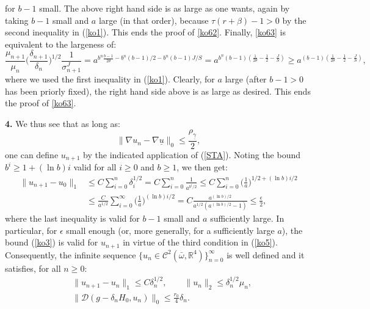 \documentclass[reqno,twoside,11pt]{amsart}
\newcommand{\R}{\mathbb{R}}
\numberwithin{equation}{section}
\theoremstyle{plain}
\theoremstyle{definition}
\begin{document}
for $b-1$ small. The above right hand side is as large as one wants, again by taking
$b-1$ small and $a$ large (in that order), because $\tau(r+\beta)-1>0$
by the second inequality in (\ref{ko1}). This ends the proof of
\ref{ko62}. Finally, \ref{ko63} is equivalent to the largeness of:
\begin{equation*} 
\frac{\mu_{n+1}}{\mu_n}\big(\frac{\delta_{n+1}}{\delta_n}\big)^{1/2}\frac{1}{\sigma_{n+1}^J}
= a^{b^n\frac{b-1}{2\theta} - b^n(b-1)/2-b^n(b-1)J/S} =
a^{b^n(b-1)(\frac{1}{2\theta}-\frac{1}{2}-\frac{J}{S}) }\geq
a^{(b-1)(\frac{1}{2\theta}-\frac{1}{2}-\frac{J}{S})},
\end{equation*}
where we used the first inequality in (\ref{ko1}). Clearly, for $a$
large (after $b-1>0$ has been priorly fixed), the right hand side
above is as large as desired. This ends the proof of \ref{ko63}. 

\smallskip

{\bf 4.} We thus see that as long as:
\begin{equation}\label{ko3}
\|\nabla u_n - \nabla \underline u\|_0\leq \frac{\rho_{\underline \gamma}}{2},
\end{equation}
one can define $u_{n+1}$ by the indicated application of (\ref{STA}). 
Noting the bound $b^i\geq 1+(\ln b)i$ valid for all $i\geq 0$ and $b\geq 1$, we then get: 
\begin{equation}\label{ko7} 
\begin{split}
\|u_{n+1}-u_0\|_1& \leq C\sum_{i=0}^{n}\delta_i^{1/2}= C\sum_{i=0}^{n}
\frac{1}{a^{b^i/2}}\leq C\sum_{i=0}^{n}
\Big(\frac{1}{a}\Big)^{1/2+(\ln b)i/2} \\ & \leq \frac{C}{a^{1/2}}\sum_{i=0}^\infty
\Big(\frac{1}{a}\Big)^{(\ln b)i/2} = C \frac{a^{(\ln b)/2}}{a^{1/2} (a^{(\ln b)/2}-1)}\leq\frac{\epsilon}{2},
\end{split}
\end{equation}
where the last inequality is valid for $b-1$ small and $a$ sufficiently large. 
In particular, for $\epsilon$ small enough (or, more generally, for a
sufficiently large $a$), the bound (\ref{ko3}) is valid for $u_{n+1}$ in
virtue of the third condition in (\ref{ko5}). Consequently, the infinite sequence
$\{u_n\in\mathcal{C}^2(\bar\omega,\R^4)\}_{n=0}^\infty$ is well
defined and it satisfies, for all $n\geq 0$:
\begin{equation}\label{ko8}
\begin{split}
& \|u_{n+1}-u_n\|_1\leq C\delta_{n}^{1/2}, \qquad \|u_{n}\|_2\leq \delta_{n}^{1/2}\mu_{n},\\
& \|\mathcal{D}(g-\delta_{n}H_0, u_{n})\|_0\leq \frac{r_0}{4}\delta_{n}.
\end{split}
\end{equation}
\end{document}
